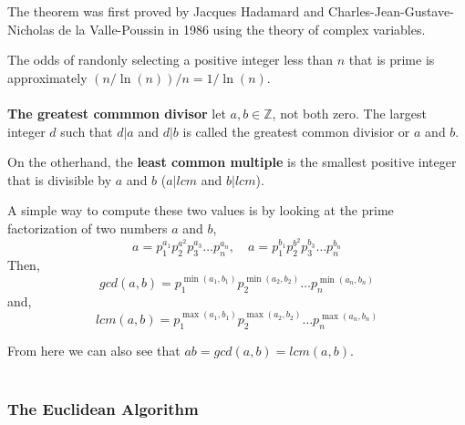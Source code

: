 The theorem was first proved by Jacques Hadamard and Charles-Jean-Gustave-Nicholas de la Valle-Poussin
in 1986 using the theory of complex variables.

The odds of randonly selecting a positive integer less than $n$ that is prime is approximately $(n / \ln(n)) / n = 1 / \ln(n)$.
\\~\\


\textbf{The greatest commmon divisor} let $a,b \in \mathbb{Z}$, not both zero.
The largest integer $d$ such that $d|a$ and $d|b$ is called the greatest common divisior or $a$ and $b$.

On the otherhand, the \textbf{least common multiple} is the smallest positive integer that is divisible by $a$ and $b$
($a|lcm$ and $b|lcm$).

A simple way to compute these two values is by looking at the prime factorization of two numbers $a$ and $b$,
$$
a = p^{a_1}_{1} p^{a^2}_{2} p^{a_3}_{3} \ldots p^{a_n}_{n}, \quad a = p^{b_1}_{1} p^{b^2}_{2} p^{b_3}_{3} \ldots p^{b_n}_{n}
$$
Then,
$$
gcd(a,b) = p^{\min(a_1, b_1)}_{1} p^{\min(a_2, b_2)}_{2} \ldots p^{\min(a_n, b_n)}_{n}
$$
and,
$$
lcm(a,b) = p^{\max(a_1, b_1)}_{1} p^{\max(a_2, b_2)}_{2} \ldots p^{\max(a_n, b_n)}_{n}
$$

From here we can also see that $ab = gcd(a,b) = lcm(a,b)$.
\\~\\


\subsubsection{The Euclidean Algorithm}